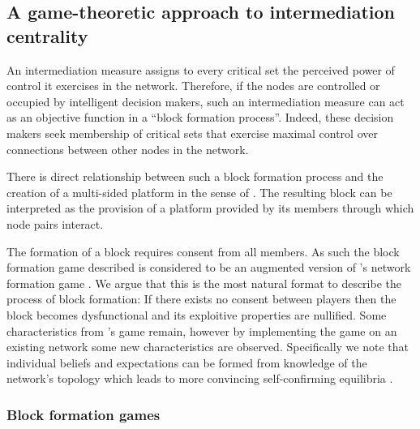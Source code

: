\subsection{A game-theoretic approach to intermediation centrality}

An intermediation measure assigns to every critical set the perceived power of control it exercises in the network. Therefore, if the nodes are controlled or occupied by intelligent decision makers, such an intermediation measure can act as an objective function in a ``block formation process''. Indeed, these decision makers seek membership of critical sets that exercise maximal control over connections between other nodes in the network.

There is direct relationship between such a block formation process and the creation of a multi-sided platform in the sense of \citet{HagiuWright2015}. The resulting block can be interpreted as the provision of a platform provided by its members through which node pairs interact.

The formation of a block requires consent from all members. As such the block formation game described is considered to be an augmented version of \citeauthor{Myerson1991}'s network formation game \cite[see][page 448]{Myerson1991}. We argue that this is the most natural format to describe the process of block formation: If there exists no consent between players then the block becomes dysfunctional and its exploitive properties are nullified. Some characteristics from \citeauthor{Myerson1991}'s game remain, however by implementing the game on an existing network some new characteristics are observed. Specifically we note that individual beliefs and expectations can be formed from knowledge of the network's topology which leads to more convincing self-confirming equilibria \citep{GillesSarangi2010}.

\subsubsection{Block formation games}

